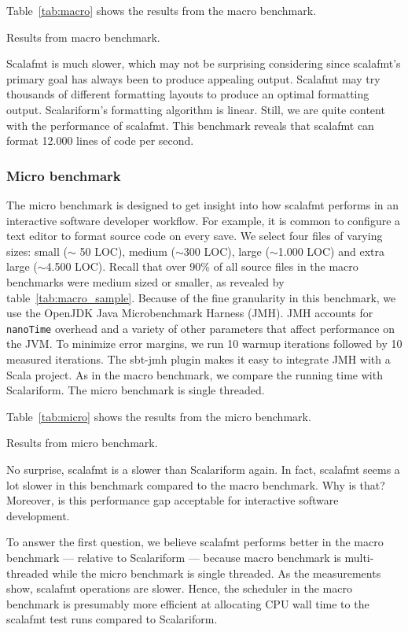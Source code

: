 Table~\ref{tab:macro} shows the results from the macro benchmark.
\begin{table}
  \centering
  \caption{Results from macro benchmark.}\label{tab:macro}
  
\end{table}
Scalafmt is much slower, which may not be surprising considering since scalafmt's primary goal has always been to produce appealing output.
Scalafmt may try thousands of different formatting layouts to produce an optimal formatting output.
Scalariform's formatting algorithm is linear.
Still, we are quite content with the performance of scalafmt.
This benchmark reveals that scalafmt can format 12.000 lines of code per second.


\subsubsection{Micro benchmark}
The micro benchmark is designed to get insight into how scalafmt performs in an interactive software developer workflow.
For example, it is common to configure a text editor to format source code on every save.
We select four files of varying sizes: small ($\sim$ 50 LOC), medium ($\sim$300 LOC), large ($\sim$1.000 LOC) and extra large ($\sim$4.500 LOC).
Recall that over 90\% of all source files in the macro benchmarks were medium sized or smaller, as revealed by table~\ref{tab:macro_sample}.
Because of the fine granularity in this benchmark, we use the OpenJDK Java Microbenchmark Harness (JMH)\autocite{OpenJ38:online}.
JMH accounts for \texttt{nanoTime} overhead and a variety of other parameters that affect performance on the JVM.
To minimize error margins, we run 10 warmup iterations followed by 10 measured iterations.
The sbt-jmh\autocite{ktoso84:online} plugin makes it easy to integrate JMH with a Scala project.
As in the macro benchmark, we compare the running time with Scalariform.
The micro benchmark is single threaded.

Table~\ref{tab:micro} shows the results from the micro benchmark.
\begin{table}
  \centering
  \caption{Results from micro benchmark.}\label{tab:micro}
  
\end{table}
No surprise, scalafmt is a slower than Scalariform again.
In fact, scalafmt seems a lot slower in this benchmark compared to the macro benchmark.
Why is that?
Moreover, is this performance gap acceptable for interactive software development.

To answer the first question, we believe scalafmt performs better in the macro benchmark --- relative to Scalariform --- because macro benchmark is multi-threaded while the micro benchmark is single threaded.
As the measurements show, scalafmt operations are slower.
Hence, the scheduler in the macro benchmark is presumably more efficient at allocating CPU wall time to the scalafmt test runs compared to Scalariform.

